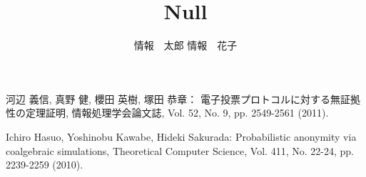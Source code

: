 \documentclass[a4j,8pt,twocolumn]{extarticle}
\title{Null}
\author{情報　太郎 \qquad 情報　花子}
\affiliation{情報大学情報学部}
\begin{document}
	
\maketitle
\thispagestyle{empty}	%






\begin{thebibliography}{9}
河辺 義信, 真野 健, 櫻田 英樹, 塚田 恭章：
電子投票プロトコルに対する無証拠性の定理証明,
情報処理学会論文誌,
Vol. 52, No. 9, pp. 2549-2561 (2011).

Ichiro Hasuo, Yoshinobu Kawabe, Hideki Sakurada:
Probabilistic anonymity via coalgebraic simulations,
Theoretical Computer Science,
Vol. 411, No. 22-24, pp. 2239-2259 (2010).
\end{thebibliography}


\end{document}
